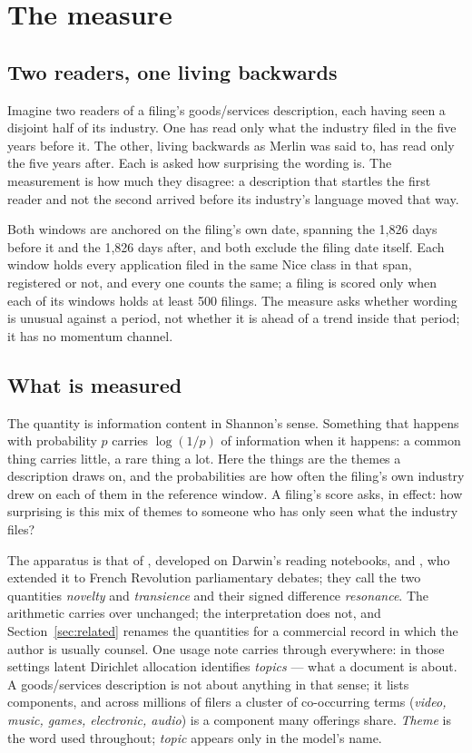 \section{The measure}\label{sec:measure}\label{sec:construct}

\subsection{Two readers, one living backwards}

Imagine two readers of a filing's goods/services description, each having
seen a disjoint half of its industry. One has read only what the industry
filed in the five years before it. The other, living backwards as Merlin
was said to, has read only the five years after. Each is asked how
surprising the wording is. The measurement is how much they disagree: a
description that startles the first reader and not the second arrived
before its industry's language moved that way.

Both windows are anchored on the filing's own date, spanning the 1,826
days before it and the 1,826 days after, and both exclude the filing
date itself. Each window holds every application filed in the same Nice
class in that span, registered or not, and every one counts the same; a
filing is scored only when each of its windows holds at least 500
filings. The measure asks whether wording is unusual against a period,
not whether it is ahead of a trend inside that period; it has no
momentum channel.

\subsection{What is measured}

The quantity is information content in Shannon's sense. Something that
happens with probability $p$ carries $\log(1/p)$ of information when it
happens: a common thing carries little, a rare thing a lot. Here the
things are the themes a description draws on, and the probabilities are
how often the filing's own industry drew on each of them in the
reference window. A filing's score asks, in effect: how surprising is
this mix of themes to someone who has only seen what the industry files?

The apparatus is that of \citet{Murdock2017}, developed on Darwin's
reading notebooks, and \citet{Barron2018}, who extended it to French
Revolution parliamentary debates; they call the two quantities
\emph{novelty} and \emph{transience} and their signed difference
\emph{resonance}. The arithmetic carries over unchanged; the
interpretation does not, and Section~\ref{sec:related} renames the
quantities for a commercial record in which the author is usually
counsel. One usage note carries through everywhere: in those settings
latent Dirichlet allocation identifies \emph{topics} --- what a document
is about. A goods/services description is not about anything in that
sense; it lists components, and across millions of filers a cluster of
co-occurring terms (\emph{video, music, games, electronic, audio}) is a
component many offerings share. \emph{Theme} is the word used
throughout; \emph{topic} appears only in the model's name.

